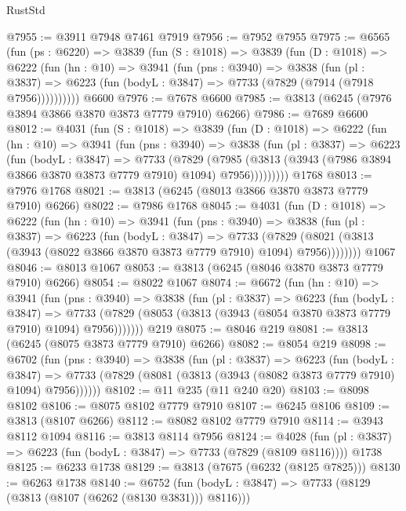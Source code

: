 \begin{lexlean}{RustStd}
\begin{coremodule}
{\begin{coremodule}
{{{{{{{{{{{{{{{{{{{{{{{{{{{{{{{{{{{@7955 := @3911 @7948 @7461 @7919
@7956 := @7952 @7955
@7975 := @6565
    (fun (ps : @6220) =>
    @3839
      (fun (S : @1018) =>
      @3839
        (fun (D : @1018) =>
        @6222
          (fun (hn : @10) =>
          @3941
            (fun (pns : @3940) =>
            @3838
              (fun (pl : @3837) =>
              @6223 (fun (bodyL : @3847) => @7733 (@7829 (@7914 (@7918 @7956))))))))))
    @6600
@7976 := @7678 @6600
@7985 := @3813 (@6245 (@7976 @3894 @3866 @3870 @3873 @7779 @7910) @6266)
@7986 := @7689 @6600
@8012 := @4031
    (fun (S : @1018) =>
    @3839
      (fun (D : @1018) =>
      @6222
        (fun (hn : @10) =>
        @3941
          (fun (pns : @3940) =>
          @3838
            (fun (pl : @3837) =>
            @6223
              (fun (bodyL : @3847) =>
              @7733
                (@7829
                  (@7985
                    (@3813 (@3943 (@7986 @3894 @3866 @3870 @3873 @7779 @7910) @1094) @7956)))))))))
    @1768
@8013 := @7976 @1768
@8021 := @3813 (@6245 (@8013 @3866 @3870 @3873 @7779 @7910) @6266)
@8022 := @7986 @1768
@8045 := @4031
    (fun (D : @1018) =>
    @6222
      (fun (hn : @10) =>
      @3941
        (fun (pns : @3940) =>
        @3838
          (fun (pl : @3837) =>
          @6223
            (fun (bodyL : @3847) =>
            @7733
              (@7829 (@8021 (@3813 (@3943 (@8022 @3866 @3870 @3873 @7779 @7910) @1094) @7956))))))))
    @1067
@8046 := @8013 @1067
@8053 := @3813 (@6245 (@8046 @3870 @3873 @7779 @7910) @6266)
@8054 := @8022 @1067
@8074 := @6672
    (fun (hn : @10) =>
    @3941
      (fun (pns : @3940) =>
      @3838
        (fun (pl : @3837) =>
        @6223
          (fun (bodyL : @3847) =>
          @7733 (@7829 (@8053 (@3813 (@3943 (@8054 @3870 @3873 @7779 @7910) @1094) @7956)))))))
    @219
@8075 := @8046 @219
@8081 := @3813 (@6245 (@8075 @3873 @7779 @7910) @6266)
@8082 := @8054 @219
@8098 := @6702
    (fun (pns : @3940) =>
    @3838
      (fun (pl : @3837) =>
      @6223
        (fun (bodyL : @3847) =>
        @7733 (@7829 (@8081 (@3813 (@3943 (@8082 @3873 @7779 @7910) @1094) @7956))))))
@8102 := @11 @235 (@11 @240 @20)
@8103 := @8098 @8102
@8106 := @8075 @8102 @7779 @7910
@8107 := @6245 @8106
@8109 := @3813 (@8107 @6266)
@8112 := @8082 @8102 @7779 @7910
@8114 := @3943 @8112 @1094
@8116 := @3813 @8114 @7956
@8124 := @4028
    (fun (pl : @3837) => @6223 (fun (bodyL : @3847) => @7733 (@7829 (@8109 @8116))))
    @1738
@8125 := @6233 @1738
@8129 := @3813 (@7675 (@6232 (@8125 @7825)))
@8130 := @6263 @1738
@8140 := @6752
    (fun (bodyL : @3847) => @7733 (@8129 (@3813 (@8107 (@6262 (@8130 @3831))) @8116)))
}}}}}}}}}}}}}}}}}}}}}}}}}}}}}}}}}}}
\end{coremodule}}
\end{coremodule}
\end{lexlean}
